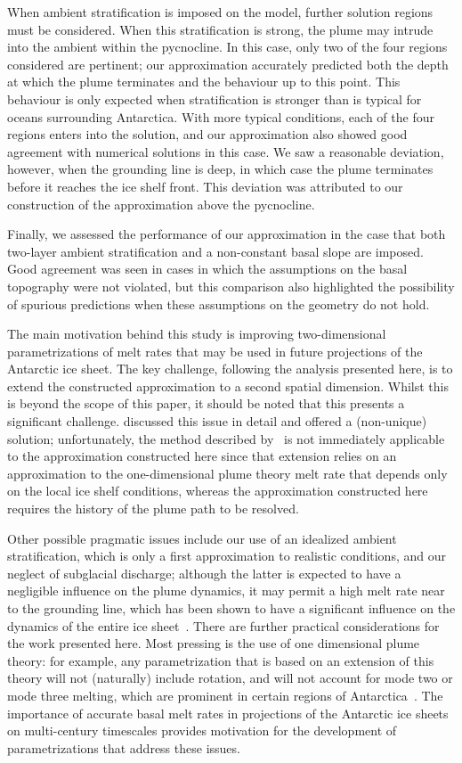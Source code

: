 \documentclass[openacc]{rsproca_new}%
\begin{document}
When ambient stratification is imposed on the model, further solution regions must be considered. When this stratification is strong, the plume may intrude into the ambient within the pycnocline. In this case, only two of the four regions considered are pertinent; our approximation accurately predicted both the depth at which the plume terminates and the behaviour up to this point. This behaviour is only expected when stratification is stronger than is typical for oceans surrounding Antarctica. With more typical conditions, each of the four regions enters into the solution, and our approximation also showed good agreement with numerical solutions in this case. We saw a reasonable deviation, however, when the grounding line is deep, in which case the plume terminates before it reaches the ice shelf front. This deviation was attributed to our construction of the approximation above the pycnocline.

Finally, we assessed the performance of our approximation in the case that both two-layer ambient stratification and a non-constant basal slope are imposed. Good agreement was seen in cases in which the assumptions on the basal topography were not violated, but this comparison also highlighted the possibility of spurious predictions when these assumptions on the geometry do not hold.

%
The main motivation behind this study is improving two-dimensional parametrizations of melt rates that may be used in future projections of the Antarctic ice sheet. The key challenge, following the analysis presented here, is to extend the constructed approximation to a second spatial dimension. Whilst this is beyond the scope of this paper, it should be noted that this presents a significant challenge. \citet{Lazeroms2018TheCryo} discussed this issue in detail and offered a (non-unique) solution; unfortunately, the method described by~\citet{Lazeroms2018TheCryo} is not immediately applicable to the approximation constructed here since that extension relies on an approximation to the one-dimensional plume theory melt rate that depends only on the local ice shelf conditions, whereas the approximation constructed here requires the history of the plume path to be resolved. 

Other possible pragmatic issues include our use of an idealized ambient stratification, which is only a first approximation to realistic conditions, and our neglect of subglacial discharge; although the latter is expected to have a negligible influence on the plume dynamics, it may permit a high melt rate near to the grounding line, which has been shown to have a significant influence on the dynamics of the entire ice sheet~\citep{Arthern2017GRL}. There are further practical considerations for the work presented here. Most pressing is the use of one dimensional plume theory: for example, any parametrization that is based on an extension of this theory will not (naturally) include rotation, and will not account for mode two or mode three melting, which are prominent in certain regions of Antarctica~\citep{Adusumilli2020NatureGeo}. The importance of accurate basal melt rates in projections of the Antarctic ice sheets on multi-century timescales provides motivation for the development of parametrizations that address these issues. 
\end{document}
